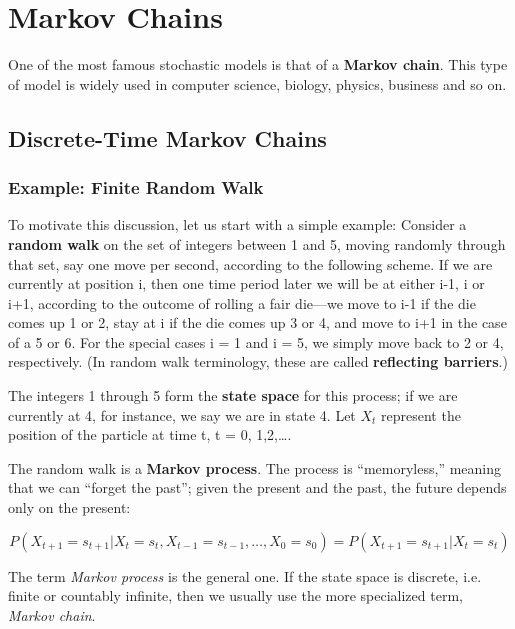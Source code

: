 \chapter{Markov Chains}
\label{mar} 

One of the most famous stochastic models is that of a {\bf Markov chain}.
This type of model is widely used in computer science, biology, physics,
business and so on.

\section{Discrete-Time Markov Chains}

\subsection{Example:  Finite Random Walk}
\label{finite}

To motivate this discussion, let us start with a
simple example: Consider a \textbf{random walk} on the set of integers
between 1 and 5, moving randomly through that set, say one move per
second, according to the following scheme.  If we are currently at
position i, then one time period later we will be at either i-1, i or
i+1, according to the outcome of rolling a fair die---we move to i-1 if
the die comes up 1 or 2, stay at i if the die comes up 3 or 4, and move
to i+1 in the case of a 5 or 6. For the special cases i = 1 and i =
5, we simply move back to 2 or 4, respectively.  (In random walk
terminology, these are called {\bf reflecting barriers}.)

The integers 1 through 5 form the \textbf{state space} for this process;
if we are currently at 4, for instance, we say we are in state 4.
Let $X_{t}$ represent the position of the particle at time t, t =
0, 1,2,\ldots{}.

The random walk is a \textbf{Markov process}. The process is
``memoryless,'' meaning that we can ``forget the past''; given the
present and the past, the future depends only on the
present:

\begin{equation}
P(X_{t+1}=s_{t+1}|X_{t}=s_{t},X_{t-1}=s_{t-1},\ldots ,X_{0}=s_{0})=P(X_{t+1}=s_{t+1}|X_{t}=s_{t})
\end{equation}

The term {\it Markov process} is the general one.  If the state space is
discrete, i.e. finite or countably infinite, then we usually use the more
specialized term, {\it Markov chain}.

